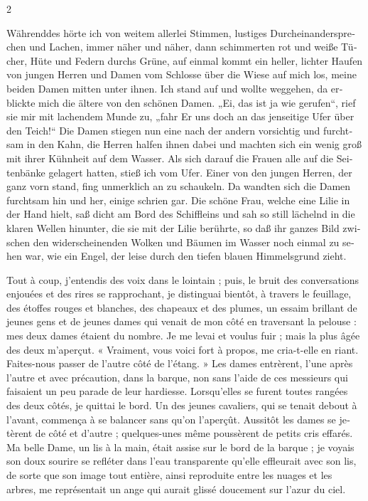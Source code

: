 \documentclass[a4paper,11pt]{article}
\newcommand\chunks[2]{%
\begin{leftcolumn*}\begin{otherlanguage}{german}%
{#1}%
\end{otherlanguage}\end{leftcolumn*}%
\begin{rightcolumn}\begin{otherlanguage}{french}%
{#2}%
\end{otherlanguage}\end{rightcolumn}%
}
\begin{document}
\begin{paracol}{2}
  \chunks{Währenddes hörte ich von weitem allerlei Stimmen, lustiges Durcheinandersprechen und Lachen, immer näher und näher, dann schimmerten rot und weiße Tücher, Hüte und Federn durchs Grüne, auf einmal kommt ein heller, lichter Haufen von jungen Herren und Damen vom Schlosse über die Wiese auf mich los, meine beiden Damen mitten unter ihnen. Ich stand auf und wollte weggehen, da erblickte mich die ältere von den schönen Damen. „Ei, das ist ja wie gerufen“, rief sie mir mit lachendem Munde zu, „fahr Er uns doch an das jenseitige Ufer über den Teich!“ Die Damen stiegen nun eine nach der andern vorsichtig und furchtsam in den Kahn, die Herren halfen ihnen dabei und machten sich ein wenig groß mit ihrer Kühnheit auf dem Wasser. Als sich darauf die Frauen alle auf die Seitenbänke gelagert hatten, stieß ich vom Ufer. Einer von den jungen Herren, der ganz vorn stand, fing unmerklich an zu schaukeln. Da wandten sich die Damen furchtsam hin und her, einige schrien gar. Die schöne Frau, welche eine Lilie in der Hand hielt, saß dicht am Bord des Schiffleins und sah so still lächelnd in die klaren Wellen hinunter, die sie mit der Lilie berührte, so daß ihr ganzes Bild zwischen den widerscheinenden Wolken und Bäumen im Wasser noch einmal zu sehen war, wie ein Engel, der leise durch den tiefen blauen Himmelsgrund zieht.}
         {Tout à coup, j’entendis des voix dans le lointain ; puis, le bruit des conversations enjouées et des rires se rapprochant, je distinguai bientôt, à travers le feuillage, des étoffes rouges et blanches, des chapeaux et des plumes, un essaim brillant de jeunes gens et de jeunes dames qui venait de mon côté en traversant la pelouse : mes deux dames étaient du nombre. Je me levai et voulus fuir ; mais la plus âgée des deux m’aperçut. « Vraiment, vous voici fort à propos, me cria-t-elle en riant. Faites-nous passer de l’autre côté de l’étang. » Les dames entrèrent, l’une après l’autre et avec précaution, dans la barque, non sans l’aide de ces messieurs qui faisaient un peu parade de leur hardiesse. Lorsqu’elles se furent toutes rangées des deux côtés, je quittai le bord. Un des jeunes cavaliers, qui se tenait debout à l’avant, commença à se balancer sans qu’on l’aperçût. Aussitôt les dames se jetèrent de côté et d’autre ; quelques-unes même poussèrent de petits cris effarés. Ma belle Dame, un lis à la main, était assise sur le bord de la barque ; je voyais son doux sourire se refléter dans l’eau transparente qu’elle effleurait avec son lis, de sorte que son image tout entière, ainsi reproduite entre les nuages et les arbres, me représentait un ange qui aurait glissé doucement sur l’azur du ciel.}

\end{paracol}
\end{document}
